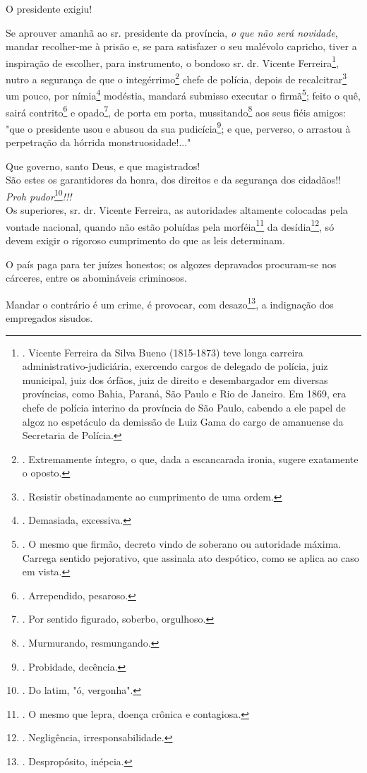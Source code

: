 O presidente exigiu!

Se aprouver amanhã ao sr. presidente da província, \emph{o que não será
novidade}, mandar recolher-me à prisão e, se para satisfazer o seu
malévolo capricho, tiver a inspiração de escolher, para instrumento, o
bondoso sr. dr. Vicente Ferreira\footnote{. Vicente Ferreira da Silva
  Bueno (1815-1873) teve longa carreira administrativo-judiciária,
  exercendo cargos de delegado de polícia, juiz municipal, juiz dos
  órfãos, juiz de direito e desembargador em diversas províncias, como
  Bahia, Paraná, São Paulo e Rio de Janeiro. Em 1869, era chefe de
  polícia interino da província de São Paulo, cabendo a ele papel de
  algoz no espetáculo da demissão de Luiz Gama do cargo de amanuense da
  Secretaria de Polícia.}, nutro a segurança de que o
integérrimo\footnote{. Extremamente íntegro, o que, dada a escancarada
  ironia, sugere exatamente o oposto.} chefe de polícia, depois de
recalcitrar\footnote{. Resistir obstinadamente ao cumprimento de uma
  ordem.} um pouco, por nímia\footnote{. Demasiada, excessiva.}
modéstia, mandará submisso executar o firmã\footnote{. O mesmo que
  firmão, decreto vindo de soberano ou autoridade máxima. Carrega
  sentido pejorativo, que assinala ato despótico, como se aplica ao caso
  em vista.}; feito o quê, sairá contrito\footnote{. Arrependido,
  pesaroso.} e opado\footnote{. Por sentido figurado, soberbo,
  orgulhoso.}, de porta em porta, mussitando\footnote{. Murmurando,
  resmungando.} aos seus fiéis amigos: "que o presidente usou e abusou
da sua pudicícia\footnote{. Probidade, decência.}; e que, perverso, o
arrastou à perpetração da hórrida monstruosidade!..."

Que governo, santo Deus, e que magistrados!\\
São estes os garantidores da honra, dos direitos e da segurança dos
cidadãos!!\\
\emph{Proh pudor}\footnote{. Do latim, "ó, vergonha".}\emph{!!!}\\
Os superiores, sr. dr. Vicente Ferreira, as autoridades altamente
colocadas pela vontade nacional, quando não estão poluídas pela
morféia\footnote{. O mesmo que lepra, doença crônica e contagiosa.} da
desídia\footnote{. Negligência, irresponsabilidade.}, só devem exigir o
rigoroso cumprimento do que as leis determinam.

O país paga para ter juízes honestos; os algozes depravados procuram-se
nos cárceres, entre os abomináveis criminosos.

Mandar o contrário é um crime, é provocar, com desazo\footnote{.
  Despropósito, inépcia.}, a indignação dos empregados sisudos.

